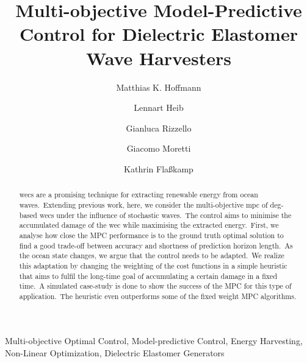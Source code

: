 \documentclass[algo2e]{ifacconf}
\begin{document}
	\begin{frontmatter}
		
		\title{Multi-objective Model-Predictive Control for Dielectric Elastomer Wave Harvesters} 
		
		\author[First]{Matthias K. Hoffmann} 
		\author[First]{Lennart Heib} 
		\author[Second]{Gianluca Rizzello}
		\author[Third]{Giacomo Moretti}
		\author[First]{Kathrin Flaßkamp} 
		
		\address[First]{Systems Modelling and Simulation,\linebreak (e-mail:~\{{matthias.hoffmann, kathrin.flasskamp\}@uni-saarland.de, lennartheib@gmail.com})}
		\address[Second]{Adaptive Polymer Systems,\linebreak	(e-mail:~gianluca.rizzello@imsl.uni-saarland.de)}
		\address[Third]{Università degli Studi di Trento, (e-mail:~giacomo.moretti@unitn.it)
			\linebreak
			$^{*}$ and $^{**}$ from Saarland University, Saarbrücken, Germany.}
		
		\begin{abstract}                %
		\Acp{wec} are a promising technique for extracting renewable energy from ocean waves.\ 
		Extending previous work, here, we consider the multi-objective \ac{mpc} of \ac{deg}-based \acp{wec} under the influence of stochastic waves.\
		The control aims to minimise the accumulated damage of the \ac{wec} while maximising the extracted energy.\
		First, we analyse how close the MPC performance is to the ground truth optimal solution to find a good trade-off between accuracy and shortness of prediction horizon length.\ 
		As the ocean state changes, we argue that the control needs to be adapted.\
		We realize this adaptation by changing the weighting of the cost functions in a simple heuristic that aims to fulfil the long-time goal of accumulating a certain damage in a fixed time.\ 
		A simulated case-study is done to show the success of the MPC for this type of application.\
		The heuristic even outperforms some of the fixed weight MPC algorithms.
		\end{abstract}
		
		\begin{keyword}
			Multi-objective Optimal Control, Model-predictive Control, Energy Harvesting, Non-Linear Optimization, Dielectric Elastomer Generators
		\end{keyword}
		
	\end{frontmatter}
	
	
	
	
	
	
	
	
\end{document}
